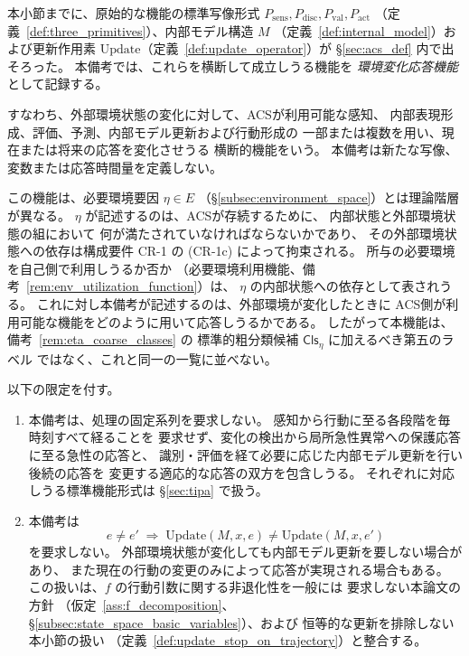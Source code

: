 \begin{remark}
\label{rem:env_change_response}

本小節までに、原始的な機能の標準写像形式
$P_{\mathrm{sens}},P_{\mathrm{disc}},P_{\mathrm{val}},P_{\mathrm{act}}$
（定義~\ref{def:three_primitives}）、内部モデル構造 $M$
（定義~\ref{def:internal_model}）および更新作用素
$\mathrm{Update}$（定義~\ref{def:update_operator}）が
\S\ref{sec:acs_def} 内で出そろった。
本備考では、これらを横断して成立しうる機能を
\emph{環境変化応答機能}として記録する。

すなわち、外部環境状態の変化に対して、ACSが利用可能な感知、
内部表現形成、評価、予測、内部モデル更新および行動形成の
一部または複数を用い、現在または将来の応答を変化させうる
横断的機能をいう。
本備考は新たな写像、変数または応答時間量を定義しない。

この機能は、必要環境要因 $\eta\in E$
（\S\ref{subsec:environment_space}）とは理論階層が異なる。
$\eta$ が記述するのは、ACSが存続するために、
内部状態と外部環境状態の組において
何が満たされていなければならないかであり、
その外部環境状態への依存は構成要件 CR-1 の (CR-1c) によって拘束される。
所与の必要環境を自己側で利用しうるか否か
（必要環境利用機能、備考~\ref{rem:env_utilization_function}）は、
$\eta$ の内部状態への依存として表されうる。
これに対し本備考が記述するのは、外部環境が変化したときに
ACS側が利用可能な機能をどのように用いて応答しうるかである。
したがって本機能は、備考~\ref{rem:eta_coarse_classes} の
標準的粗分類候補 $\mathsf{Cls}_\eta$ に加えるべき第五のラベル
ではなく、これと同一の一覧に並べない。

以下の限定を付す。

\begin{enumerate}[label=(\alph*)]
  \item 本備考は、処理の固定系列を要求しない。
  感知から行動に至る各段階を毎時刻すべて経ることを
  要求せず、変化の検出から局所急性異常への保護応答に至る急性の応答と、
  識別・評価を経て必要に応じた内部モデル更新を行い後続の応答を
  変更する適応的な応答の双方を包含しうる。
  それぞれに対応しうる標準機能形式は
  \S\ref{sec:tipa} で扱う。

  \item 本備考は
  \[
    e\neq e'
    \;\Longrightarrow\;
    \mathrm{Update}(M,x,e)\neq\mathrm{Update}(M,x,e')
  \]
  を要求しない。
  外部環境状態が変化しても内部モデル更新を要しない場合があり、
  また現在の行動の変更のみによって応答が実現される場合もある。
  この扱いは、$f$ の行動引数に関する非退化性を一般には
  要求しない本論文の方針
  （仮定~\ref{ass:f_decomposition}、
  \S\ref{subsec:state_space_basic_variables}）、および
  恒等的な更新を排除しない本小節の扱い
  （定義~\ref{def:update_stop_on_trajectory}）と整合する。


\end{enumerate}
\end{remark}
